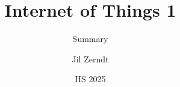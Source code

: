 \documentclass[a4paper, fontsize = 8pt, landscape]{scrartcl}
\title{Internet of Things 1}
\subtitle{Summary}
\author{Jil Zerndt}
\date{HS 2025}
\begin{document}
\begin{multicols}{2}
	\thispagestyle{TitlePageStyle}
	\maketitleinfo
	\sffamily
	
	\raggedcolumns
	\columnbreak 
\end{multicols}
\end{document}

